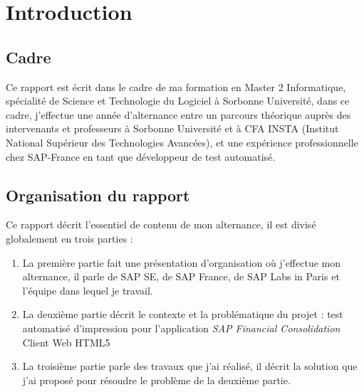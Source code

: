 \section{Introduction}
\subsection{Cadre}
Ce rapport est écrit dans le cadre de ma formation en Master 2 Informatique, spécialité de Science et Technologie du Logiciel à Sorbonne Université, dans ce cadre, j'effectue une année d'alternance entre un parcours théorique auprès des intervenants et professeurs à Sorbonne Université et à CFA INSTA (Institut National Supérieur des Technologies Avancées), et une expérience professionnelle chez SAP-France en tant que développeur de test automatisé.


\subsection{Organisation du rapport}
Ce rapport décrit l'essentiel de contenu de mon alternance, il est divisé globalement en trois parties : 
    \begin{enumerate}
        \item La première partie fait une présentation d'organisation où j'effectue mon alternance, il parle de SAP SE, de SAP France, de SAP Labs in Paris et l'équipe dans lequel je travail.
        \item La deuxième partie décrit le contexte et la problématique du projet : test automatisé d'impression pour l'application \textit{SAP Financial Consolidation} Client Web HTML5
        \item La troisième partie parle des travaux que j'ai réalisé, il décrit la solution que j'ai proposé pour résoudre le problème de la deuxième partie.
    \end{enumerate} 
